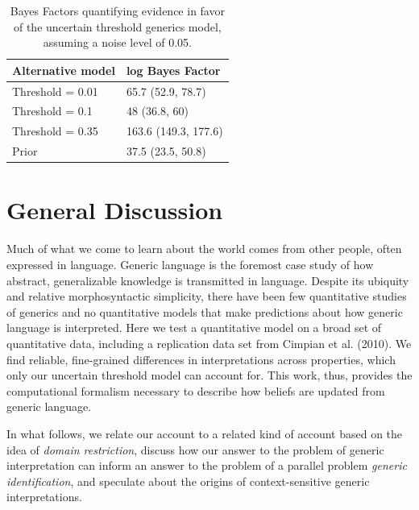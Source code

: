 \documentclass[floatsintext,doc]{apa6}
\theoremstyle{definition}
\theoremstyle{definition}
\theoremstyle{definition}
\theoremstyle{remark}
\begin{document}

\begin{table}[h]
\centering
\begingroup\fontsize{9pt}{10pt}\selectfont
\begin{tabular}{ll}
  \hline
Alternative model & log Bayes Factor \\ 
  \hline
Threshold = 0.01 & 65.7 (52.9, 78.7) \\ 
  Threshold = 0.1 & 48 (36.8, 60) \\ 
  Threshold = 0.35 & 163.6 (149.3, 177.6) \\ 
  Prior & 37.5 (23.5, 50.8) \\ 
   \hline
\end{tabular}
\endgroup
\caption{Bayes Factors quantifying evidence in favor of the uncertain threshold generics model, assuming a noise level of 0.05.} 
\end{table}

\section{General Discussion}\label{general-discussion}

Much of what we come to learn about the world comes from other people,
often expressed in language. Generic language is the foremost case study
of how abstract, generalizable knowledge is transmitted in language.
Despite its ubiquity and relative morphosyntactic simplicity, there have
been few quantitative studies of generics and no quantitative models
that make predictions about how generic language is interpreted. Here we
test a quantitative model on a broad set of quantitative data, including
a replication data set from Cimpian et al. (2010). We find reliable,
fine-grained differences in interpretations across properties, which
only our uncertain threshold model can account for. This work, thus,
provides the computational formalism necessary to describe how beliefs
are updated from generic language.

In what follows, we relate our account to a related kind of account
based on the idea of \emph{domain restriction}, discuss how our answer
to the problem of generic interpretation can inform an answer to the
problem of a parallel problem \emph{generic identification}, and
speculate about the origins of context-sensitive generic
interpretations.
\end{document}
